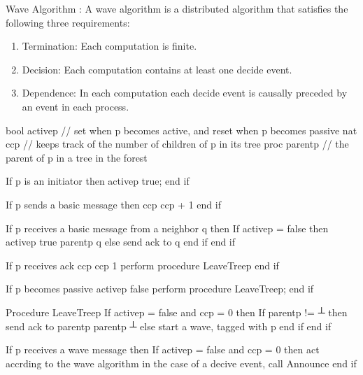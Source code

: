 \documentclass[letterpaper,10pt,english]{sphinxmanual}
\begin{document}
\sphinxAtStartPar
Wave Algorithm : A wave algorithm is a distributed algorithm that satisfies the following three requirements:
\begin{enumerate}
%
\item {} 
\sphinxAtStartPar
Termination: Each computation is finite.

\item {} 
\sphinxAtStartPar
Decision: Each computation contains at least one decide event.

\item {} 
\sphinxAtStartPar
Dependence: In each computation each decide event is causally preceded by an event in each process.

\end{enumerate}
\def\sphinxLiteralBlockLabel{\label{\detokenize{docs/ShavitFranchezAlg/algorithm:id9}}\label{\detokenize{docs/ShavitFranchezAlg/algorithm:shavitfranchesterminationdetectionalgorithm}}}
\begin{sphinxVerbatim}[commandchars=\\\{\},numbers=left,firstnumber=1,stepnumber=1]
bool active\PYGZlt{}p\PYGZgt{} // set when p becomes active, and reset when p becomes passive
nat cc\PYGZlt{}p\PYGZgt{} // keeps track of the number of children of p in its tree
proc parent\PYGZlt{}p\PYGZgt{} // the parent of p in a tree in the forest

If p is an initiator then
    active\PYGZlt{}p\PYGZgt{} \PYGZlt{}\PYGZhy{} true;
end if

If p sends a basic message then
    cc\PYGZlt{}p\PYGZgt{} \PYGZlt{}\PYGZhy{} cc\PYGZlt{}p\PYGZgt{} + 1
end if

If p receives a basic message from a neighbor q then
    If active\PYGZlt{}p\PYGZgt{} = false then
        active\PYGZlt{}p\PYGZgt{} \PYGZlt{}\PYGZhy{} true
        parent\PYGZlt{}p\PYGZgt{} \PYGZlt{}\PYGZhy{} q
    else
        send \PYGZlt{}ack\PYGZgt{} to q
    end if
end if

If p receives \PYGZlt{}ack\PYGZgt{}
    cc\PYGZlt{}p\PYGZgt{} \PYGZlt{}\PYGZhy{} cc\PYGZlt{}p\PYGZgt{} \PYGZhy{} 1
    perform procedure LeaveTree\PYGZlt{}p\PYGZgt{}
end if

If p becomes passive
    active\PYGZlt{}p\PYGZgt{} \PYGZlt{}\PYGZhy{} false
    perform procedure LeaveTree\PYGZlt{}p\PYGZgt{};
end if

Procedure LeaveTree\PYGZlt{}p\PYGZgt{}
    If active\PYGZlt{}p\PYGZgt{} = false and cc\PYGZlt{}p\PYGZgt{} = 0 then
        If parent\PYGZlt{}p\PYGZgt{} != ┴ then
            send \PYGZlt{}ack\PYGZgt{} to parent\PYGZlt{}p\PYGZgt{}
            parent\PYGZlt{}p\PYGZgt{} \PYGZlt{}\PYGZhy{} ┴
        else
            start a wave, tagged with p
        end if
    end if

If p receives a wave message then
    If active\PYGZlt{}p\PYGZgt{} = false and cc\PYGZlt{}p\PYGZgt{} = 0 then
        act accrding to the wave algorithm
        in the case of a decive event, call Announce
    end if
\end{sphinxVerbatim}
\end{document}
